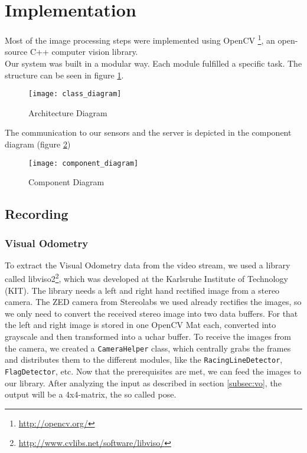\section{Implementation}
\label{sec:implementation}

Most of the image processing steps were implemented using OpenCV \footnote{\url{http://opencv.org/}}, an open-source C++ computer vision library.\\
Our system was built in a modular way. Each module fulfilled a specific task. The structure can be seen in figure \ref{fig:class_diagram}.

\begin{figure}[!ht]
\texttt{[image: class\_diagram]}
\caption{Architecture Diagram}
\label{fig:class_diagram}
\end{figure}

The communication to our sensors and the server is depicted in the component diagram (figure \ref{fig:component_diagram})

\begin{figure}[!ht]
	\texttt{[image: component\_diagram]}
	\caption{Component Diagram}
	\label{fig:component_diagram}
\end{figure}
\clearpage

\subsection{Recording}
\subsubsection{Visual Odometry}
To extract the Visual Odometry data from the video stream, we used a library called libviso2\footnote{\url{http://www.cvlibs.net/software/libviso/}}, which was developed at the Karlsruhe Institute of Technology (KIT). The library needs a left and right hand rectified image from a stereo camera. The ZED camera from Stereolabs we used already rectifies the images, so we only need to convert the received stereo image into two data buffers.
For that the left and right image is stored in one OpenCV Mat each, converted into grayscale and then transformed into a uchar buffer.
To receive the images from the camera, we created a \texttt{CameraHelper} class, which centrally grabs the frames and distributes them to the different modules, like the \texttt{RacingLineDetector}, \texttt{FlagDetector}, etc.
Now that the prerequisites are met, we can feed the images to our library.
After analyzing the input as described in section \ref{subsec:vo}, the output will be a 4x4-matrix, the so called pose.

